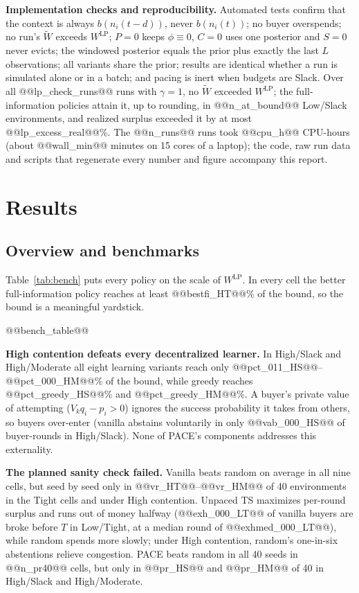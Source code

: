 \documentclass{article}
\newcommand{\WLP}{W^{\mathrm{LP}}}
\begin{document}
\textbf{Implementation checks and reproducibility.} Automated tests confirm that the context is always $b(n_i(t-d))$, never $b(n_i(t))$; no buyer overspends; no run's $\widetilde W$ exceeds $\WLP$; $P=0$ keeps $\phi\equiv0$, $C=0$ uses one posterior and $S=0$ never evicts; the windowed posterior equals the prior plus exactly the last $L$ observations; all variants share the prior; results are identical whether a run is simulated alone or in a batch; and pacing is inert when budgets are Slack. Over all @@lp_check_runs@@ runs with $\gamma=1$, no $\widetilde W$ exceeded $\WLP$; the full-information policies attain it, up to rounding, in @@n_at_bound@@ Low/Slack environments, and realized surplus exceeded it by at most @@lp_excess_real@@\%. The @@n_runs@@ runs took @@cpu_h@@ CPU-hours (about @@wall_min@@ minutes on 15 cores of a laptop); the code, raw run data and scripts that regenerate every number and figure accompany this report.

\section{Results}
\label{sec:results}
\subsection{Overview and benchmarks}
\label{sec:overview}
Table~\ref{tab:bench} puts every policy on the scale of $\WLP$. In every cell the better full-information policy reaches at least @@bestfi_HT@@\% of the bound, so the bound is a meaningful yardstick.

@@bench_table@@

\textbf{High contention defeats every decentralized learner.} In High/Slack and High/Moderate all eight learning variants reach only @@pct_011_HS@@--@@pct_000_HM@@\% of the bound, while greedy reaches @@pct_greedy_HS@@\% and @@pct_greedy_HM@@\%. A buyer's private value of attempting ($V_kq_i-p_i>0$) ignores the success probability it takes from others, so buyers over-enter (vanilla abstains voluntarily in only @@vab_000_HS@@ of buyer-rounds in High/Slack). None of PACE's components addresses this externality.

\textbf{The planned sanity check failed.} Vanilla beats random on average in all nine cells, but seed by seed only in @@vr_HT@@--@@vr_HM@@ of 40 environments in the Tight cells and under High contention. Unpaced TS maximizes per-round surplus and runs out of money halfway (@@exh_000_LT@@ of vanilla buyers are broke before $T$ in Low/Tight, at a median round of @@exhmed_000_LT@@), while random spends more slowly; under High contention, random's one-in-six abstentions relieve congestion. PACE beats random in all 40 seeds in @@n_pr40@@ cells, but only in @@pr_HS@@ and @@pr_HM@@ of 40 in High/Slack and High/Moderate.
\end{document}
